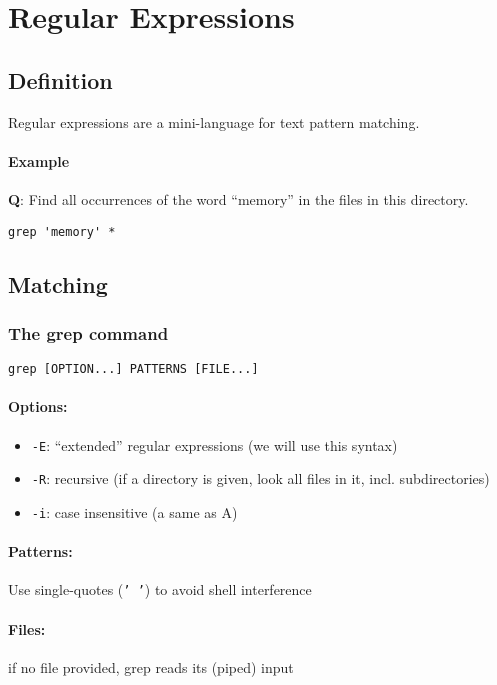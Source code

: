 \documentclass[12pt]{article}
\begin{document}
\newpage
\section{Regular Expressions}
\subsection{Definition}
Regular expressions are a mini-language for text pattern matching.
\paragraph{Example}

\textbf{Q}: Find all occurrences of the word ``memory'' in the files in this directory.

\begin{verbatim}
grep 'memory' *
\end{verbatim}

\subsection{Matching}

\subsubsection{The grep command}

\begin{verbatim}
grep [OPTION...] PATTERNS [FILE...]
\end{verbatim}

\paragraph{Options:}
\begin{itemize}
    \item \texttt{-E}: ``extended'' regular expressions (we will use this syntax)
    \item \texttt{-R}: recursive (if a directory is given, look all files in it, incl. subdirectories)
    \item \texttt{-i}: case insensitive (a same as A)
\end{itemize}

\paragraph{Patterns:}
Use single-quotes (\texttt{' '}) to avoid shell interference

\paragraph{Files:}
if no file provided, grep reads its (piped) input
\end{document}

